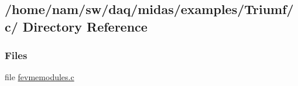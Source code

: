 \subsection{/home/nam/sw/daq/midas/examples/Triumf/c/ Directory Reference}
\label{dir_5b6d33c4e46691d194201415b862e084}
\subsubsection*{Files}
\begin{DoxyCompactItemize}
\item 
file \hyperlink{fevmemodules_8c}{fevmemodules.c}
\end{DoxyCompactItemize}
